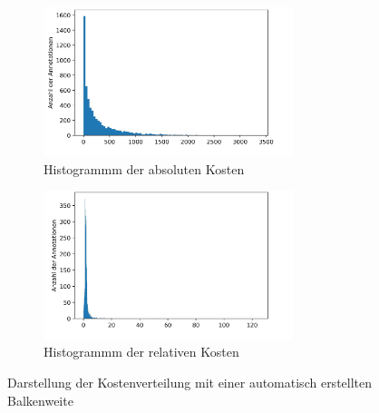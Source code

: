 \begin{figure}[!ht]%
\centering
	\begin{subfigure}[t]{.49\linewidth}%
		\centering
		\includegraphics[width=0.80\textwidth]{./Bilder/absolute Kosten.jpg}
		\caption{Histogrammm der absoluten Kosten}
	\end{subfigure}
	\begin{subfigure}[t]{.49\linewidth}%
		\centering
		\includegraphics[width=0.8\textwidth]{./Bilder/relative Kosten.jpg}
		\caption{Histogrammm der relativen Kosten}
	\end{subfigure}
\caption{Darstellung der Kostenverteilung mit einer automatisch erstellten Balkenweite}
\label{fig:Kostennebeneinander}
\end{figure}



